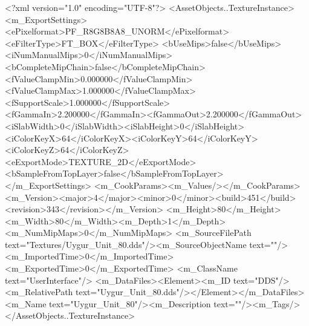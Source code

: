 <?xml version="1.0" encoding="UTF-8"?>
<AssetObjects..TextureInstance>
  <m_ExportSettings>
    <ePixelformat>PF_R8G8B8A8_UNORM</ePixelformat><eFilterType>FT_BOX</eFilterType>
    <bUseMips>false</bUseMips><iNumManualMips>0</iNumManualMips><bCompleteMipChain>false</bCompleteMipChain>
    <fValueClampMin>0.000000</fValueClampMin><fValueClampMax>1.000000</fValueClampMax><fSupportScale>1.000000</fSupportScale>
    <fGammaIn>2.200000</fGammaIn><fGammaOut>2.200000</fGammaOut><iSlabWidth>0</iSlabWidth><iSlabHeight>0</iSlabHeight>
    <iColorKeyX>64</iColorKeyX><iColorKeyY>64</iColorKeyY><iColorKeyZ>64</iColorKeyZ>
    <eExportMode>TEXTURE_2D</eExportMode><bSampleFromTopLayer>false</bSampleFromTopLayer>
  </m_ExportSettings>
  <m_CookParams><m_Values/></m_CookParams>
  <m_Version><major>4</major><minor>0</minor><build>451</build><revision>343</revision></m_Version>
  <m_Height>80</m_Height><m_Width>80</m_Width><m_Depth>1</m_Depth><m_NumMipMaps>0</m_NumMipMaps>
  <m_SourceFilePath text="Textures/Uygur_Unit_80.dds"/><m_SourceObjectName text=""/>
  <m_ImportedTime>0</m_ImportedTime><m_ExportedTime>0</m_ExportedTime>
  <m_ClassName text="UserInterface"/>
  <m_DataFiles><Element><m_ID text="DDS"/><m_RelativePath text="Uygur_Unit_80.dds"/></Element></m_DataFiles>
  <m_Name text="Uygur_Unit_80"/><m_Description text=""/><m_Tags/>
</AssetObjects..TextureInstance>
